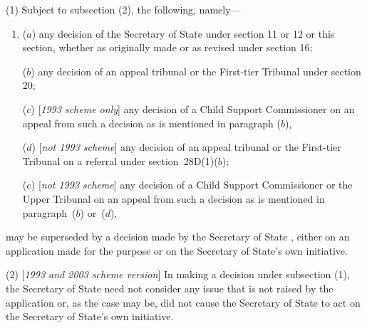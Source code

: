 \documentclass[12pt,a4paper]{article}
\begin{document}
(1) Subject to subsection (2), the following, namely—
\begin{enumerate}\item[]
($a$) any decision of the 
Secretary of State  %
under section 11 or 12 or this section, whether as originally made or as revised under section 16;

($b$) any decision of 
an appeal tribunal or  %
the First-tier Tribunal  %
under section 20; 

($c$) [\emph{1993 scheme only}] any decision of a Child Support Commissioner on an appeal from such a decision as is mentioned in paragraph ($b$),


($d$) [\emph{not 1993 scheme}] any decision of 
an appeal tribunal or  %
the First-tier Tribunal  %
on a referral under section~28D(1)($b$);

($e$) [\emph{not 1993 scheme}] any decision of 
a Child Support Commissioner or  %
the Upper Tribunal  %
on an appeal from such a decision as is mentioned in paragraph~($b$)  or~($d$),
\end{enumerate}
may be superseded by a decision made by the 
Secretary of State%
, either on an application made for the purpose or on 
the Secretary of State's  %
own initiative.

(2) [\emph{1993 and 2003 scheme version}] In making a decision under subsection (1), the 
Secretary of State  %
need not consider any issue that is not raised by the application or, as the case may be, did not cause 
the Secretary of State  %
to act on 
the Secretary of State's  %
own initiative.
\end{document}
